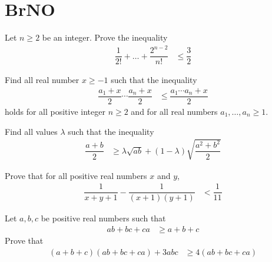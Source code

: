 \documentclass{subfile}
\begin{document}
	\section{BrNO}\label{sec:brmo}
	
		\begin{problem}[$2018$, problem $9$]
			Let $n\geq2$ be an integer. Prove the inequality
				\begin{align*}
					\dfrac{1}{2!}+\ldots+\dfrac{2^{n-2}}{n!}
						& \leq\dfrac{3}{2}
				\end{align*}
		\end{problem}
	
		\begin{problem}
			Find all real number $x\geq-1$ such that the inequality
				\begin{align*}
					\dfrac{a_{1}+x}{2}\cdots\dfrac{a_{n}+x}{2}
						& \leq \dfrac{a_{1}\cdots a_{n}+x}{2}
				\end{align*}
			holds for all positive integer $n\geq2$ and for all real numbers $a_{1},\ldots,a_{n}\geq1$.
		\end{problem}
	
		\begin{problem}
			Find all values $\lambda$ such that the inequality
				\begin{align*}
					\dfrac{a+b}{2}
						& \geq\lambda\sqrt{ab}+(1-\lambda)\sqrt{\dfrac{a^{2}+b^{2}}{2}}
				\end{align*}
		\end{problem}
	
		\begin{problem}
			Prove that for all positive real numbers $x$ and $y$,
				\begin{align*}
					\dfrac{1}{x+y+1}-\dfrac{1}{(x+1)(y+1)}
						& < \dfrac{1}{11}
				\end{align*}
		\end{problem}
	
		\begin{problem}[$2014$ Test $2$]
			Let $a,b,c$ be positive real numbers such that
				\begin{align*}
					ab+bc+ca
						& \geq a+b+c
				\end{align*}
			Prove that
				\begin{align*}
					(a+b+c)(ab+bc+ca)+3abc
						& \geq 4(ab+bc+ca)
				\end{align*}
		\end{problem}
	
\end{document}
